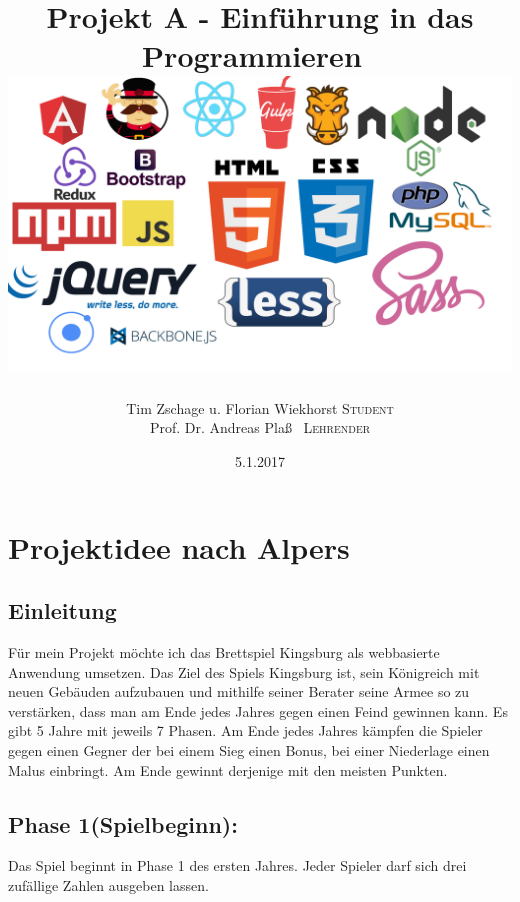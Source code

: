 \documentclass[a4paper]{scrreprt}
\begin{document}
\title{Projekt A - Einführung in das Programmieren~\\ 
\vspace{\fill}\includegraphics[scale=0.2]{collage_web}}
\author{Tim Zschage u. Florian Wiekhorst \textsc{Student}\\ Prof. Dr. Andreas Plaß~ \textsc{Lehrender}}
\publishers{HAW Hamburg}
\date{5.1.2017}
\maketitle
\tableofcontents
\newpage
\chapter{Projektidee nach Alpers}

\section{Einleitung}
Für mein Projekt möchte ich das Brettspiel Kingsburg als webbasierte Anwendung umsetzen.
Das Ziel des Spiels Kingsburg ist, sein Königreich mit neuen Gebäuden aufzubauen und mithilfe seiner Berater seine Armee so zu verstärken, dass man am Ende jedes Jahres gegen einen Feind gewinnen kann. Es gibt 5 Jahre mit jeweils 7 Phasen. Am Ende jedes Jahres kämpfen die Spieler gegen einen Gegner der bei einem Sieg einen Bonus, bei einer Niederlage einen Malus einbringt.
Am Ende gewinnt derjenige mit den meisten Punkten.


\section{Phase 1(Spielbeginn):}

Das Spiel beginnt in Phase 1 des ersten Jahres.
Jeder Spieler darf sich drei zufällige Zahlen ausgeben lassen.
\end{document}
